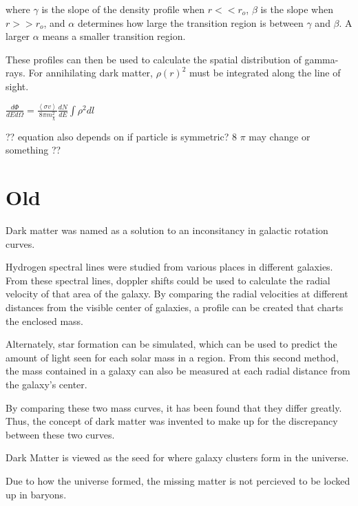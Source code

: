 where $\gamma$ is the slope of the density profile when $r << r_o$, $\beta$ is the slope when $r >> r_o$, and $\alpha$ determines how large the transition region is between $\gamma$ and $\beta$.
A larger $\alpha$ means a smaller transition region.

These profiles can then be used to calculate the spatial distribution of gamma-rays.
For annihilating dark matter, $\rho\left(r\right)^2$ must be integrated along the line of sight.

$ \frac{d\Phi}{dE d\Omega}= \frac{ \left \langle \sigma v \right \rangle }{8 \pi m_\chi^2} \frac{dN}{dE} \int \rho^2 dl $ \label{eqn:dmflux}

?? equation also depends on if particle is symmetric? 8 $\pi$ may change or something ??





\section{Old}

Dark matter was named as a solution to an inconsitancy in galactic rotation curves.

Hydrogen spectral lines were studied from various places in different galaxies.
From these spectral lines, doppler shifts could be used to calculate the radial velocity of that area of the galaxy.
By comparing the radial velocities at different distances from the visible center of galaxies, a profile can be created that charts the enclosed mass.

Alternately, star formation can be simulated, which can be used to predict the amount of light seen for each solar mass in a region.
From this second method, the mass contained in a galaxy can also be measured at each radial distance from the galaxy's center.

By comparing these two mass curves, it has been found that they differ greatly.
Thus, the concept of dark matter was invented to make up for the discrepancy between these two curves.




Dark Matter is viewed as the seed for where galaxy clusters form in the universe.


Due to how the universe formed, the missing matter is not percieved to be locked up in baryons.

